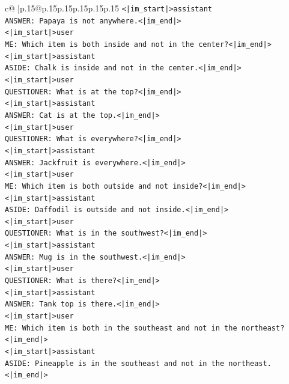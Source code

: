 \documentclass{article}
\begin{document}
{\begin{supertabular}{c@{$\;$}|p{.15\linewidth}@{}p{.15\linewidth}p{.15\linewidth}p{.15\linewidth}p{.15\linewidth}p{.15\linewidth}}
{{{\texttt{<|im\_start|>assistant} \\
\texttt{ANSWER: Papaya is not anywhere.<|im\_end|>} \\
\texttt{<|im\_start|>user} \\
\texttt{ME: Which item is both inside and not in the center?<|im\_end|>} \\
\texttt{<|im\_start|>assistant} \\
\texttt{ASIDE: Chalk is inside and not in the center.<|im\_end|>} \\
\texttt{<|im\_start|>user} \\
\texttt{QUESTIONER: What is at the top?<|im\_end|>} \\
\texttt{<|im\_start|>assistant} \\
\texttt{ANSWER: Cat is at the top.<|im\_end|>} \\
\texttt{<|im\_start|>user} \\
\texttt{QUESTIONER: What is everywhere?<|im\_end|>} \\
\texttt{<|im\_start|>assistant} \\
\texttt{ANSWER: Jackfruit is everywhere.<|im\_end|>} \\
\texttt{<|im\_start|>user} \\
\texttt{ME: Which item is both outside and not inside?<|im\_end|>} \\
\texttt{<|im\_start|>assistant} \\
\texttt{ASIDE: Daffodil is outside and not inside.<|im\_end|>} \\
\texttt{<|im\_start|>user} \\
\texttt{QUESTIONER: What is in the southwest?<|im\_end|>} \\
\texttt{<|im\_start|>assistant} \\
\texttt{ANSWER: Mug is in the southwest.<|im\_end|>} \\
\texttt{<|im\_start|>user} \\
\texttt{QUESTIONER: What is there?<|im\_end|>} \\
\texttt{<|im\_start|>assistant} \\
\texttt{ANSWER: Tank top is there.<|im\_end|>} \\
\texttt{<|im\_start|>user} \\
\texttt{ME: Which item is both in the southeast and not in the northeast?<|im\_end|>} \\
\texttt{<|im\_start|>assistant} \\
\texttt{ASIDE: Pineapple is in the southeast and not in the northeast.<|im\_end|>} \\
}}}
\end{supertabular}}
\end{document}
